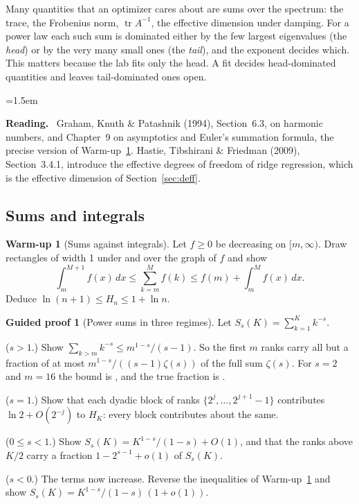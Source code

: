 \documentclass[11pt,a4paper]{article}
\DeclareMathOperator{\tr}{tr}
\theoremstyle{plain}
\theoremstyle{definition}
\newtheorem{warmup}[proposition]{Warm-up}
\newtheorem{guided}[proposition]{Guided proof}
\theoremstyle{remark}
\newenvironment{reading}{\begin{list}{}{\leftmargin=1.5em\rightmargin=0pt\topsep=6pt}\small\item[]%
  \textcolor{blue!50!black}{\textbf{Reading.}}\ }{\end{list}}
\begin{document}
Many quantities that an optimizer cares about are sums over the spectrum: the trace, the Frobenius norm,
$\tr A^{-1}$, the effective dimension under damping. For a power law each such sum is dominated either by the few
largest eigenvalues (the \emph{head}) or by the very many small ones (the \emph{tail}), and the exponent decides
which. This matters because the lab fits only the head. A fit decides head-dominated quantities and leaves
tail-dominated ones open.

\begin{reading}
Graham, Knuth \& Patashnik (1994), Section~6.3, on harmonic numbers, and Chapter~9 on asymptotics and Euler's
summation formula, the precise version of Warm-up~\ref{wu:integral}. Hastie, Tibshirani \& Friedman (2009),
Section~3.4.1, introduce the effective degrees of freedom of ridge regression, which is the effective dimension of
Section~\ref{sec:deff}.
\end{reading}

\subsection{Sums and integrals}

\begin{warmup}[Sums against integrals]\label{wu:integral}
Let $f\ge0$ be decreasing on $[m,\infty)$. Draw rectangles of width 1 under and over the graph of $f$ and show
\[\int_m^{M+1}f(x)\,dx\le\sum_{k=m}^Mf(k)\le f(m)+\int_m^Mf(x)\,dx.\]
Deduce $\ln(n+1)\le H_n\le1+\ln n$.
\end{warmup}

\begin{guided}[Power sums in three regimes]\label{gp:sums}
Let $S_s(K)=\sum_{k=1}^Kk^{-s}$.
\begin{steps}
\item ($s>1$.) Show $\sum_{k>m}k^{-s}\le m^{1-s}/(s-1)$. So the first $m$ ranks carry all but a fraction of at most
  $m^{1-s}/((s-1)\zeta(s))$ of the full sum $\zeta(s)$. For $s=2$ and $m=16$ the bound is \NumTailBoundTwo, and the
  true fraction is \NumTailTrueTwo.
\item ($s=1$.) Show that each dyadic block of ranks $\{2^j,\dots,2^{j+1}-1\}$ contributes $\ln2+O(2^{-j})$ to $H_K$:
  every block contributes about the same.
\item ($0\le s<1$.) Show $S_s(K)=K^{1-s}/(1-s)+O(1)$, and that the ranks above $K/2$ carry a fraction
  $1-2^{s-1}+o(1)$ of $S_s(K)$.
\item ($s<0$.) The terms now increase. Reverse the inequalities of Warm-up~\ref{wu:integral} and show
  $S_s(K)=K^{1-s}/(1-s)\,(1+o(1))$.
\end{steps}
\end{guided}
\end{document}
